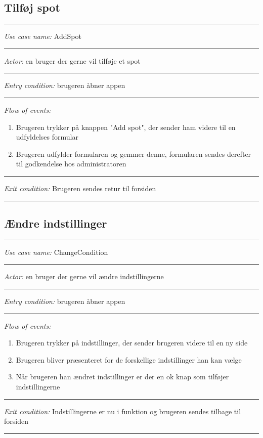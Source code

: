 \documentclass[12pt]{article}
\begin{document}
\subsection*{Tilføj spot}
\hrule\vspace{5mm}
\textit{Use case name:} AddSpot\\
\hrule\vspace{5mm}
\textit{Actor:} en bruger der gerne vil tilføje et spot\\
\hrule\vspace{5mm}
\textit{Entry condition:} brugeren åbner appen\\
\hrule\vspace{5mm}
\textit{Flow of events:}
\begin{enumerate}
\item Brugeren trykker på knappen "Add spot", der sender ham videre til en udfyldelses formular
\item Brugeren udfylder formularen og gemmer denne, formularen sendes derefter til godkendelse hos administratoren
\end{enumerate}
\hrule\vspace{5mm}
\textit{Exit condition:} Brugeren sendes retur til forsiden\\
\hrule\vspace{5mm}
\newpage
\subsection*{Ændre indstillinger}
\hrule\vspace{5mm}
\textit{Use case name:} ChangeCondition\\
\hrule\vspace{5mm}
\textit{Actor:} en bruger der gerne vil ændre indstillingerne\\
\hrule\vspace{5mm}
\textit{Entry condition:} brugeren åbner appen\\
\hrule\vspace{5mm}
\textit{Flow of events:}
\begin{enumerate}
\item Brugeren trykker på indstillinger, der sender brugeren videre til en ny side
\item Brugeren bliver præsenteret for de forskellige indstillinger han kan vælge
\item Når brugeren han ændret indstillinger er der en ok knap som tilføjer indstillingerne
\end{enumerate}
\hrule\vspace{5mm}
\textit{Exit condition:} Indstillingerne er nu i funktion og brugeren sendes tilbage til forsiden\\
\hrule\vspace{5mm}
\pagebreak
\end{document}
